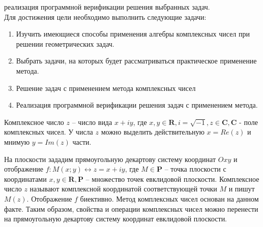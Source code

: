 реализация программной верификации решения выбранных задач.\\
Для достижения цели необходимо выполнить следующие задачи:
\begin{enumerate}
   \item Изучить имеющиеся способы применения алгебры комплексных чисел при решении геометрических
         задач.
   \item Выбрать задачи, на которых будет рассматриваться практическое применение метода.
   \item Решение задач с применением метода комплексных чисел
   \item Реализация программной верификации решения задач с применением метода.
\end{enumerate}

Комплексное число \(z\) -- число вида $x + iy$, где $x,y \in \mathbf{R}, i = \sqrt{-1},z \in \mathbf{C},
   \mathbf{C}$ - поле комплексных чисел. У числа \(z\) можно выделить действительную $x = Re(z)$ и
мнимую $y=Im(z)$ части.

На плоскости зададим прямоугольную декартову систему координат \(Oxy\) и отображение $f: M(x;y)
   \leftrightarrow z = x + iy$, где $M \in \mathbf{P}$ -- точка плоскости с координатами $x,y \in
   \mathbf{R}, \mathbf{P}$ -- множество точек евклидовой плоскости. Комплексное число $z$ называют
комплексной координатой соответствующей точки $M$ и пишут \(M(z)\).
Отображение \(f\) биективно. Метод комплексных чисел основан на данном факте. Таким образом,
свойства и операции комплексных чисел можно перенести на прямоугольную декартову систему
координат евклидовой плоскости.


